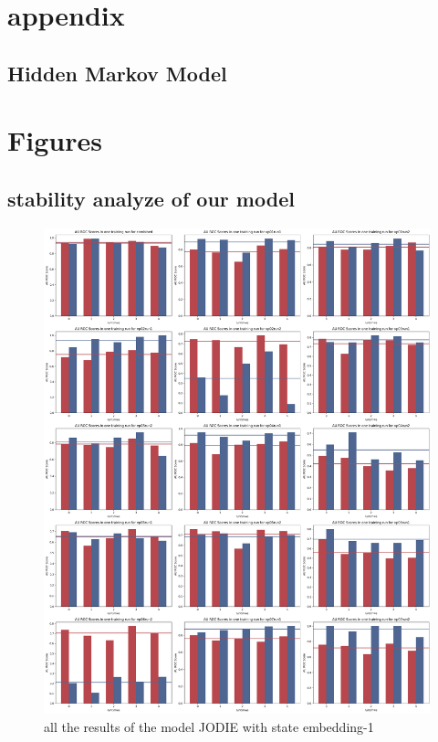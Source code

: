 \chapter{appendix}\label{chapter:appendixA}


\section{Hidden Markov Model}


\chapter{Figures}\label{chapter:appendixB}

\section{stability analyze of our model}

\begin{figure}
    \centering
    \includegraphics[width=\textwidth]{figures/05_all_results1.png}
    \caption{all the results of the model JODIE with state embedding-1} 
    \label{fig:all_results1}
\end{figure}

